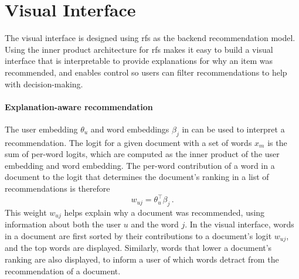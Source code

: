 \section{Visual Interface}

The visual interface is designed using \gls{rfs} as the backend recommendation model. Using the inner product architecture for \gls{rfs} makes it easy to build a visual interface that is interpretable to provide explanations for why an item was recommended, and enables control so users can filter recommendations to help with decision-making.

\paragraph{Explanation-aware recommendation} The user embedding $\theta_u$ and word embeddings $\beta_j$ in  can be used to interpret a recommendation. The logit for a given document with a set of words $x_m$ is the sum of per-word logits, which are computed as the inner product of the user embedding and word embedding. The per-word contribution of a word in a document to the logit that determines the document's ranking in a list of recommendations is therefore
\begin{equation}
  w_{uj} = \theta_u^\top \beta_j\, .
  \label{eq:word-weight}
\end{equation}
This weight $w_{uj}$ helps explain why a document was recommended, using information about both the user $u$ and the word $j$. In the visual interface, words in a document are first sorted by their contributions to a document's logit $w_{uj}$, and the top words are displayed. Similarly, words that lower a document's ranking are also displayed, to inform a user of which words detract from the recommendation of a document.

